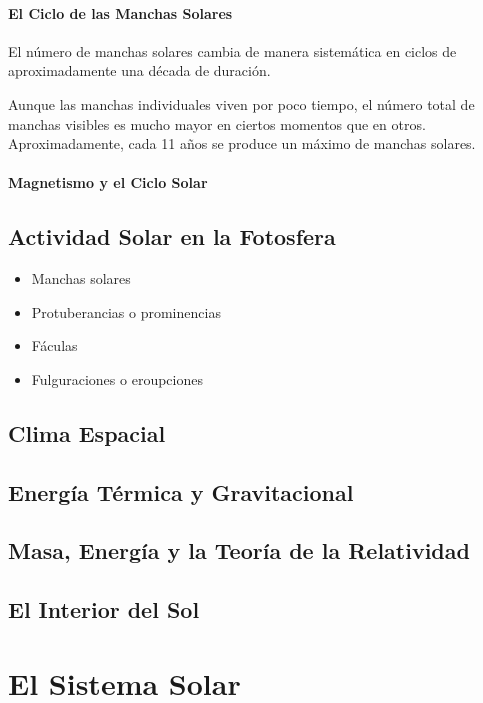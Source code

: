 \documentclass{tufte-handout}
\begin{document}
\paragraph{El Ciclo de las Manchas Solares}

El número de manchas solares cambia de manera sistemática en ciclos de aproximadamente una década de duración.

Aunque las manchas individuales viven por poco tiempo, el número total de manchas visibles es mucho mayor en ciertos momentos que en otros. Aproximadamente, cada 11 años se produce un máximo de manchas solares.

\paragraph{Magnetismo y el Ciclo Solar}

\subsection{Actividad Solar en la Fotosfera}

\begin{itemize}
  \item Manchas solares
  \item Protuberancias o prominencias
  \item Fáculas
  \item Fulguraciones o eroupciones
\end{itemize}

\subsection{Clima Espacial}

\subsection{Energía Térmica y Gravitacional}

\subsection{Masa, Energía y la Teoría de la Relatividad}

\subsection{El Interior del Sol}

\clearpage

\section{El Sistema Solar}
\end{document}
